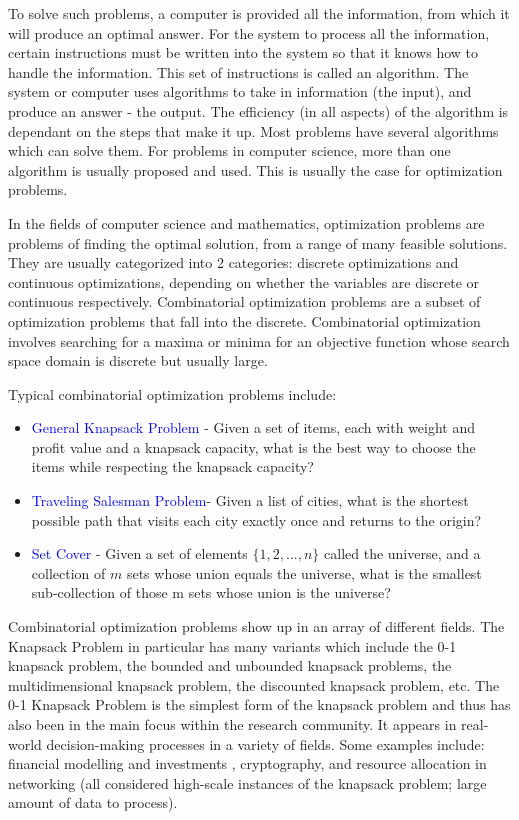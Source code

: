 \documentclass[titlepage]{article}
\begin{document}
To solve such problems, a computer is provided all the information, from which it will produce an optimal answer. For the system to process all the information, certain instructions must be written into the system so that it knows how to handle the information. This set of instructions is called an algorithm. The system or computer uses algorithms to take in information (the input), and produce an answer - the output. The efficiency (in all aspects) of the algorithm is dependant on the steps that make it up. Most problems have several algorithms which can solve them. For problems in computer science, more than one algorithm is usually proposed and used. This is usually the case for optimization problems. 

In the fields of computer science and mathematics, optimization problems are problems of finding the optimal solution, from a range of many feasible solutions. They are usually categorized into 2 categories: discrete optimizations and continuous optimizations, depending on whether the variables are discrete or continuous respectively. Combinatorial optimization problems are a subset of optimization problems that fall into the discrete. Combinatorial optimization involves searching for a maxima or minima for an objective function whose search space domain is discrete but usually large.

Typical combinatorial optimization problems include:
\begin{itemize}
    \item \textcolor{blue}{General Knapsack Problem} - Given a set of items, each with weight and profit value and a knapsack capacity, what is the best way to choose the items while respecting the knapsack capacity?
    \item \textcolor{blue}{Traveling Salesman Problem}- Given a list of cities, what is the shortest possible path that visits each city exactly once and returns to the origin?
    \item \textcolor{blue}{Set Cover} - Given a set of elements $\{1, 2, ..., n\}$ called the universe, and a collection of $m$ sets whose union equals the universe, what is the smallest sub-collection of those m sets whose union is the universe?
\end{itemize}

Combinatorial optimization problems show up in an array of different fields. The Knapsack Problem in particular has many variants which include the 0-1 knapsack problem, the bounded and unbounded knapsack problems, the multidimensional knapsack problem, the discounted knapsack problem, etc. The 0-1 Knapsack Problem is the simplest form of the knapsack problem and thus has also been in the main focus within the research community. It appears in real-world decision-making processes in a variety of fields. Some examples include: financial modelling and investments \cite{finance}, cryptography, and resource allocation in networking \cite{resource} (all considered high-scale instances of the knapsack problem; large amount of data to process).
\end{document}
